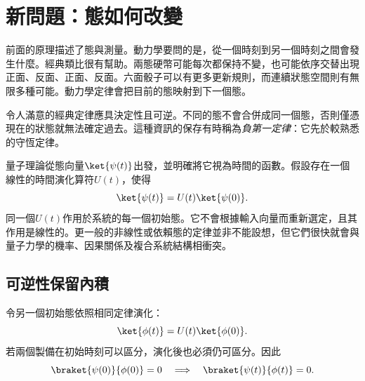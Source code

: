 \begin{classroomqa}
\end{classroomqa}

\begin{classroomqa}
\end{classroomqa}

\section{新問題：態如何改變}

前面的原理描述了態與測量。動力學要問的是，從一個時刻到另一個時刻之間會發生什麼。經典類比很有幫助。兩態硬幣可能每次都保持不變，也可能依序交替出現正面、反面、正面、反面。六面骰子可以有更多更新規則，而連續狀態空間則有無限多種可能。動力學定律會把目前的態映射到下一個態。

令人滿意的經典定律應具決定性且可逆。不同的態不會合併成同一個態，否則僅憑現在的狀態就無法確定過去。這種資訊的保存有時稱為\emph{負第一定律}：它先於較熟悉的守恆定律。

量子理論從態向量\(\ket{\psi(t)}\)出發，並明確將它視為時間的函數。假設存在一個線性的時間演化算符\(U(t)\)，使得
\begin{equation}
\ket{\psi(t)}=U(t)\ket{\psi(0)}.
\label{eq:l4-time-development}
\end{equation}
同一個\(U(t)\)作用於系統的每一個初始態。它不會根據輸入向量而重新選定，且其作用是線性的。更一般的非線性或依賴態的定律並非不能設想，但它們很快就會與量子力學的機率、因果關係及複合系統結構相衝突。

\subsection{可逆性保留內積}

令另一個初始態依照相同定律演化：
\begin{equation}
\ket{\phi(t)}=U(t)\ket{\phi(0)}.
\end{equation}
若兩個製備在初始時刻可以區分，演化後也必須仍可區分。因此
\begin{equation}
\braket{\psi(0)}{\phi(0)}=0
\quad\Longrightarrow\quad
\braket{\psi(t)}{\phi(t)}=0.
\end{equation}

